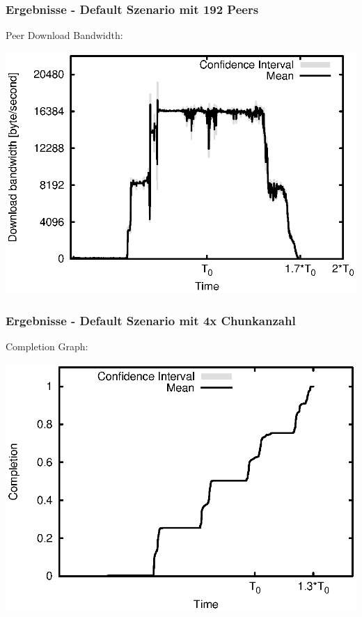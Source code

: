 \begin{frame}
  \frametitle{Ergebnisse - Default Szenario mit 192 Peers}
  Peer Download Bandwidth:
  
  \begin{center}
    \includegraphics[width=1\textwidth]{fig/plots/scenario_11_peer_count_192_v2/plots/GeneratedMeanCurrentDownloadBandwidth.csv.eps}
  \end{center}
\end{frame}


\begin{frame}
  \frametitle{Ergebnisse - Default Szenario mit 4x Chunkanzahl}
  Completion Graph:
  
  \begin{center}
    \includegraphics[width=1\textwidth]{fig/plots/scenario_15_chunk_count_fac_4/plots/GeneratedMeanChunkCompletion.csv.eps}
  \end{center}
\end{frame}



